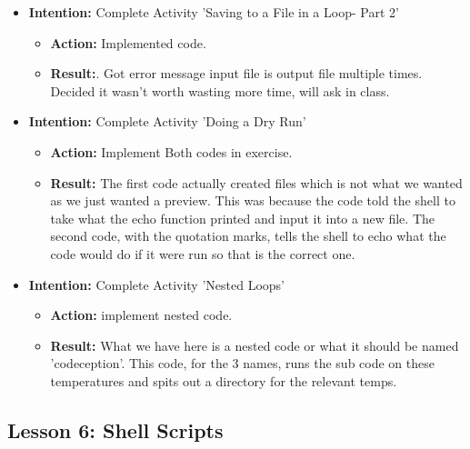 \documentclass{article}
\begin{document}
\begin{itemize}
\begin{itemize}
\end{itemize}

\item{\textbf{Intention:} Complete Activity 'Saving to a File in a Loop- Part 2'}

\begin{itemize}
\item{\textbf{Action:} Implemented code.}

\item{\textbf{Result:}. Got error message input file is output file multiple times. Decided it wasn't worth wasting more time, will ask in class.}

\end{itemize}

\item{\textbf{Intention:} Complete Activity 'Doing a Dry Run'}

\begin{itemize}
\item{\textbf{Action:} Implement Both codes in exercise.}

\item{\textbf{Result:} The first code actually created files which is not what we wanted as we just wanted a preview. This was because the code told the shell to take what the echo function printed and input it into a new file. The second code, with the quotation marks, tells the shell to echo what the code would do if it were run so that is the correct one.}

\end{itemize}

\item{\textbf{Intention:} Complete Activity 'Nested Loops'}

\begin{itemize}
\item{\textbf{Action:} implement nested code.}

\item{\textbf{Result:} What we have here is a nested code or what it should be named 'codeception'. This code, for the 3 names, runs the sub code on these temperatures and spits out a directory for the relevant temps.}

\end{itemize}

\end{itemize}

\subsection{Lesson 6: Shell Scripts}
\end{document}
